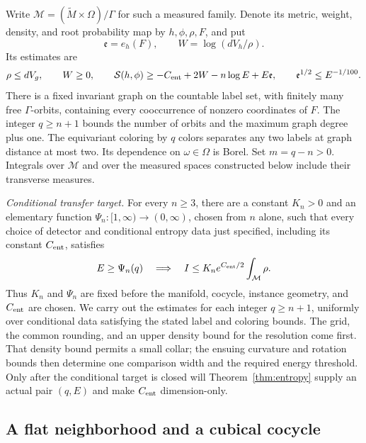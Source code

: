Write \(\mathcal M=(\widetilde M\times\Omega)/\Gamma\) for such a measured
family.  Denote its metric, weight, density, and
root probability map by \(h,\phi,\rho,F\), and put
\[
 \mathfrak e=e_h(F),\qquad W=\log(dV_h/\rho).
\]
Its estimates are
\begin{equation}\label{eq:transfer-entropy}
 \rho\leq dV_g,\qquad W\geq0,\qquad
 \mathcal S(h,\phi)\geq-C_{\rm ent}+2W-n\log E+E\mathfrak e,
 \qquad \mathfrak e^{1/2}\leq E^{-1/100}.
\end{equation}
There is a fixed invariant graph on the countable label set, with finitely
many free \(\Gamma\)-orbits, containing every cooccurrence of nonzero
coordinates of \(F\).  The integer \(q\geq n+1\) bounds the number of
orbits and the maximum graph degree plus one.  The equivariant coloring
by \(q\) colors separates any two labels at graph distance at most two.
Its dependence on \(\omega\in\Omega\) is Borel.  Set
\(m=q-n>0\).  Integrals over \(\mathcal M\) and over the measured spaces
constructed below include their transverse measures.

\medskip\noindent\emph{Conditional transfer target.}
For every \(n\geq3\), there are a constant \(K_n>0\) and an elementary
function \(\Psi_n:[1,\infty)\to(0,\infty)\), chosen from \(n\) alone,
such that every choice of detector and conditional entropy data just
specified, including its constant \(C_{\rm ent}\), satisfies
\begin{equation}\label{eq:transfer-conditional-target}
 E\geq\Psi_n(q)\quad\Longrightarrow\quad
       I\leq K_n e^{C_{\rm ent}/2}\int_{\mathcal M}\rho.
\end{equation}
Thus \(K_n\) and \(\Psi_n\) are fixed before the manifold, cocycle,
instance geometry, and \(C_{\rm ent}\) are chosen.  We carry out the
estimates for each integer \(q\geq n+1\), uniformly over conditional
data satisfying the stated label and coloring bounds.
The grid, the common rounding, and an upper density bound for the
resolution come first.  That density bound permits a small collar;
the ensuing curvature and rotation bounds then determine one comparison
width and the required energy threshold.  Only after the conditional
target is closed will Theorem~\ref{thm:entropy} supply an actual pair
\((q,E)\) and make \(C_{\rm ent}\) dimension-only.

\subsection{A flat neighborhood and a cubical cocycle}

